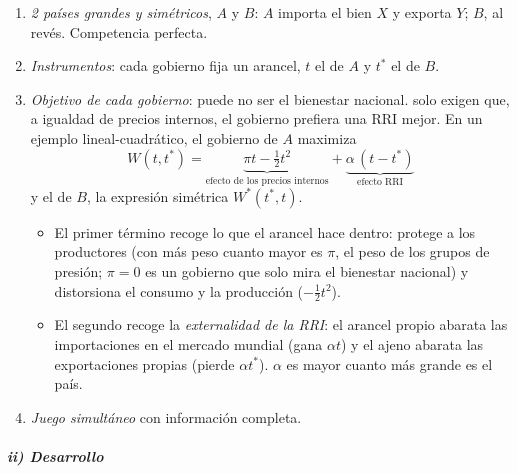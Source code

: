 \documentclass[11pt]{article}
\begin{document}
\begin{enumerate}
\item \emph{2 países grandes y simétricos}, $A$ y $B$: $A$ importa el bien $X$ y exporta $Y$; $B$, al revés. Competencia perfecta.
\item \emph{Instrumentos}: cada gobierno fija un arancel, $t$ el de $A$ y $t^*$ el de $B$.
\item \emph{Objetivo de cada gobierno}: puede no ser el bienestar nacional. \textcite{BagwellStaiger1999Economic} solo exigen que, a igualdad de precios internos, el gobierno prefiera una RRI mejor. En un ejemplo lineal-cuadrático, el gobierno de $A$ maximiza
  \[W(t,t^*)=\underbrace{\pi t-\tfrac12 t^2}_{\text{efecto de los precios internos}}+\underbrace{\alpha\,(t-t^*)}_{\text{efecto RRI}}\]
  y el de $B$, la expresión simétrica $W^*(t^*,t)$.
  \begin{itemize}
  \item El primer término recoge lo que el arancel hace dentro: protege a los productores (con más peso cuanto mayor es $\pi$, el peso de los grupos de presión; $\pi=0$ es un gobierno que solo mira el bienestar nacional) y distorsiona el consumo y la producción ($-\tfrac12t^2$).
  \item El segundo recoge la \emph{externalidad de la RRI}: el arancel propio abarata las importaciones en el mercado mundial (gana $\alpha t$) y el ajeno abarata las exportaciones propias (pierde $\alpha t^*$). $\alpha$ es mayor cuanto más grande es el país.
  \end{itemize}
\item \emph{Juego simultáneo} con información completa.
\end{enumerate}

\subparagraph{ii) Desarrollo}
\end{document}
